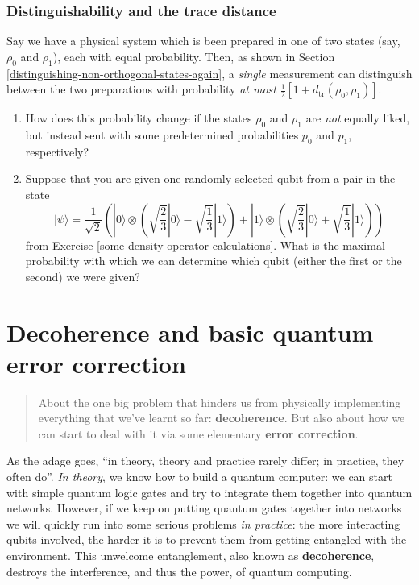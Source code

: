 \documentclass[fleqn,a4paper]{article}
\let\oldsection\section
\renewcommand\section{\clearpage\oldsection}
\theoremstyle{definition}
\theoremstyle{definition}
\theoremstyle{definition}
\theoremstyle{definition}
\theoremstyle{remark}
\begin{document}
\hypertarget{distinguishability-and-trace-distance-exercise}{%
\subsubsection{Distinguishability and the trace distance}\label{distinguishability-and-trace-distance-exercise}}

Say we have a physical system which is been prepared in one of two states (say, \(\rho_0\) and \(\rho_1\)), each with equal probability.
Then, as shown in Section \ref{distinguishing-non-orthogonal-states-again}, a \emph{single} measurement can distinguish between the two preparations with probability \emph{at most} \(\frac{1}{2}[1+d_{\operatorname{tr}}(\rho_0,\rho_1)]\).

\begin{enumerate}
\def\labelenumi{\arabic{enumi}.}
\item
  How does this probability change if the states \(\rho_0\) and \(\rho_1\) are \emph{not} equally liked, but instead sent with some predetermined probabilities \(p_0\) and \(p_1\), respectively?
\item
  Suppose that you are given one randomly selected qubit from a pair in the state
  \[
   |\psi\rangle =
   \frac{1}{\sqrt{2}}\left(
     |0\rangle\otimes\left(
       \sqrt{\frac23}|0\rangle
       - \sqrt{\frac13}|1\rangle
     \right)
     + |1\rangle\otimes\left(
       \sqrt{\frac23}|0\rangle
       + \sqrt{\frac13}|1\rangle
     \right)
   \right)
    \]
  from Exercise \ref{some-density-operator-calculations}.
  What is the maximal probability with which we can determine which qubit (either the first or the second) we were given?
\end{enumerate}

\hypertarget{decoherence-and-basic-quantum-error-correction}{%
\section{Decoherence and basic quantum error correction}\label{decoherence-and-basic-quantum-error-correction}}

\begin{quote}
About the one big problem that hinders us from physically implementing everything that we've learnt so far: \textbf{decoherence}.
But also about how we can start to deal with it via some elementary \textbf{error correction}.
\end{quote}

As the adage goes, ``in theory, theory and practice rarely differ; in practice, they often do''.
\emph{In theory}, we know how to build a quantum computer: we can start with simple quantum logic gates and try to integrate them together into quantum networks.
However, if we keep on putting quantum gates together into networks we will quickly run into some serious problems \emph{in practice}: the more interacting qubits involved, the harder it is to prevent them from getting entangled with the environment.
This unwelcome entanglement, also known as \textbf{decoherence}, destroys the interference, and thus the power, of quantum computing.
\end{document}
